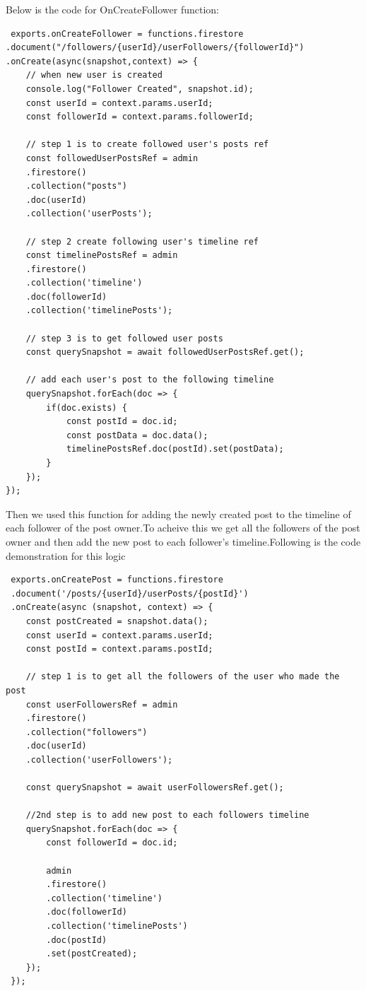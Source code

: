 Below is the code for OnCreateFollower function:
\begin{verbatim}
 exports.onCreateFollower = functions.firestore
.document("/followers/{userId}/userFollowers/{followerId}")
.onCreate(async(snapshot,context) => {
    // when new user is created
    console.log("Follower Created", snapshot.id);
    const userId = context.params.userId;
    const followerId = context.params.followerId;

    // step 1 is to create followed user's posts ref
    const followedUserPostsRef = admin
    .firestore()
    .collection("posts")
    .doc(userId)
    .collection('userPosts');

    // step 2 create following user's timeline ref
    const timelinePostsRef = admin
    .firestore()
    .collection('timeline')
    .doc(followerId)
    .collection('timelinePosts');

    // step 3 is to get followed user posts
    const querySnapshot = await followedUserPostsRef.get();

    // add each user's post to the following timeline
    querySnapshot.forEach(doc => {
        if(doc.exists) {
            const postId = doc.id;
            const postData = doc.data();
            timelinePostsRef.doc(postId).set(postData);
        }
    });
});
\end{verbatim}

Then we used this function for adding the newly created post to the timeline of each follower of the post owner.To acheive this we get all the followers of the post owner and then add the new post to each follower's timeline.Following is the code demonstration for this logic
\begin{verbatim}
 exports.onCreatePost = functions.firestore
 .document('/posts/{userId}/userPosts/{postId}')
 .onCreate(async (snapshot, context) => {
    const postCreated = snapshot.data();
    const userId = context.params.userId;
    const postId = context.params.postId;

    // step 1 is to get all the followers of the user who made the post
    const userFollowersRef = admin
    .firestore()
    .collection("followers")
    .doc(userId)
    .collection('userFollowers');

    const querySnapshot = await userFollowersRef.get();

    //2nd step is to add new post to each followers timeline
    querySnapshot.forEach(doc => {
        const followerId = doc.id;

        admin
        .firestore()
        .collection('timeline')
        .doc(followerId)
        .collection('timelinePosts')
        .doc(postId)
        .set(postCreated);
    });
 });

\end{verbatim}
